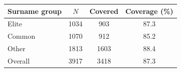 \begin{tabular}{lccc}
\toprule
Surname group & $N$ & Covered & Coverage (\%) \\
\midrule
Elite & 1034 & 903 & 87.3 \\
Common & 1070 & 912 & 85.2 \\
Other & 1813 & 1603 & 88.4 \\
\midrule
Overall & 3917 & 3418 & 87.3 \\
\bottomrule
\end{tabular}
